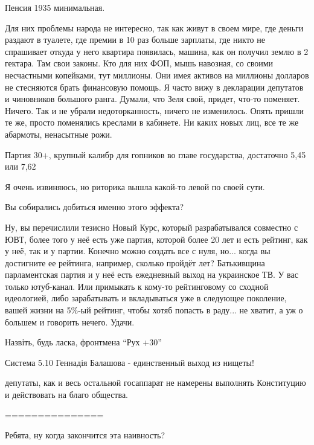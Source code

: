 \begin{itemize}
Пенсия 1935 минимальная.


Для них проблемы народа не интересно, так как живут в своем мире, где деньги
раздают в туалете, где премии в 10 раз больше зарплаты, где никто не спрашивает
откуда у него квартира появилась, машина, как он получил землю в 2 гектара. Там
свои законы. Кто для них ФОП, мышь навозная, со своими несчастными копейками,
тут миллионы. Они имея активов на миллионы долларов не стесняются брать
финансовую помощь. Я часто вижу в декларации депутатов и чиновников большого
ранга. Думали, что Зеля свой, придет, что-то поменяет. Ничего. Так и не убрали
недоторканность, ничего не изменилось. Опять пришли те же, просто поменялись
креслами в кабинете. Ни каких новых лиц, все те же абармоты, ненасытные рожи.

Партия 30+, крупный калибр для гопников во главе государства, достаточно 5,45 или 7,62


Я очень извиняюсь, но риторика вышла какой-то левой по своей сути.

Вы собирались добиться именно этого эффекта?


Ну, вы перечислили тезисно Новый Курс, который разрабатывался совместно с ЮВТ,
более того у неё есть уже партия, которой более 20 лет и есть рейтинг, как у
неё, так и у партии. Конечно можно создать все с нуля, но... когда вы достигните
ее рейтинга, например, сколько пройдёт лет? Батькивщина парламентская партия и
у неё есть ежедневный выход на украинское ТВ. У вас только ютуб-канал. Или
примыкать к кому-то рейтинговому со сходной идеологией, либо зарабатывать и
вкладываться уже в следующее поколение, вашей жизни на 5\%-ый рейтинг, чтобы
хотяб попасть в раду... не хватит, а уж о большем и говорить нечего. Удачи.


Назвіть, будь ласка, фронтмена \enquote{Рух +30}

Система 5.10 Геннадія Балашова - единственный выход из нищеты!


депутаты, как и весь остальной госаппарат не намерены выполнять Конституцию и
действовать на благо общества.

===============

Ребята, ну когда закончится эта наивность?


\end{itemize}
